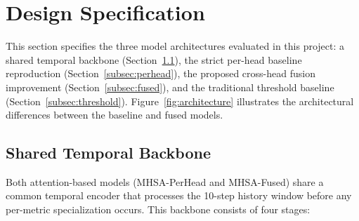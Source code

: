 
\section{Design Specification}
\label{sec:Design}

This section specifies the three model architectures evaluated in this project: a shared temporal backbone (Section~\ref{subsec:backbone}), the strict per-head baseline reproduction (Section~\ref{subsec:perhead}), the proposed cross-head fusion improvement (Section~\ref{subsec:fused}), and the traditional threshold baseline (Section~\ref{subsec:threshold}). Figure~\ref{fig:architecture} illustrates the architectural differences between the baseline and fused models.

\subsection{Shared Temporal Backbone}
\label{subsec:backbone}

Both attention-based models (MHSA-PerHead and MHSA-Fused) share a common temporal encoder that processes the 10-step history window before any per-metric specialization occurs. This backbone consists of four stages:

